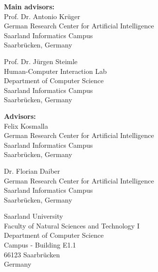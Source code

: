 \pagestyle{empty}

\vspace*{0.5cm}
\textbf{Main advisors:}\\
Prof. Dr. Antonio Krüger\\
German Research Center for Artificial Intelligence\\
Saarland Informatics Campus\\
Saarbrücken, Germany

\vspace*{0.5cm}
Prof. Dr. Jürgen Steimle\\
Human-Computer Interaction Lab\\
Department of Computer Science\\
Saarland Informatics Campus\\
Saarbrücken, Germany

\vspace*{0.5cm}
\textbf{Advisors:}\\
Felix Kosmalla\\
German Research Center for Artificial Intelligence\\
Saarland Informatics Campus\\
Saarbrücken, Germany

\vspace*{0.5cm}
Dr. Florian Daiber\\
German Research Center for Artificial Intelligence\\
Saarland Informatics Campus\\
Saarbrücken, Germany


\vspace{2.5cm}

\vspace{1cm}
Saarland University\\
Faculty of Natural Sciences and Technology I\\
Department of Computer Science\\
Campus - Building E1.1\\
66123 Saarbrücken\\
Germany\\


